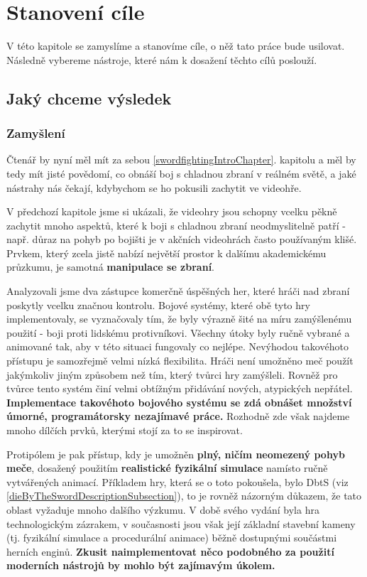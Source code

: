 \chapter{Stanovení cíle}

V této kapitole se zamyslíme a stanovíme cíle, o něž tato práce bude usilovat. Následně vybereme nástroje, které nám k dosažení těchto cílů poslouží.  


\section{Jaký chceme výsledek}

\subsection{Zamyšlení}
Čtenář by nyní měl mít za sebou \ref{swordfightingIntroChapter}. kapitolu a měl by tedy mít jisté povědomí, co obnáší boj s chladnou zbraní v reálném světě, a jaké nástrahy nás čekají, kdybychom se ho pokusili zachytit ve videohře. 

V předchozí kapitole jsme si ukázali, že videohry jsou schopny vcelku pěkně zachytit mnoho aspektů, které k boji s chladnou zbraní neodmyslitelně patří - např. důraz na pohyb po bojišti je v akčních videohrách často používaným klišé. Prvkem, který zcela jistě nabízí největší prostor k dalšímu akademickému průzkumu, je samotná \textbf{manipulace se zbraní}.

Analyzovali jsme dva zástupce komerčně úspěšných her, které hráči nad zbraní poskytly vcelku značnou kontrolu. Bojové systémy, které obě tyto hry implementovaly, se vyznačovaly tím, že byly výrazně šité na míru zamýšlenému použití - boji proti lidskému protivníkovi. Všechny útoky byly ručně vybrané a animované tak, aby v této situaci fungovaly co nejlépe. Nevýhodou takovéhoto přístupu je samozřejmě velmi nízká flexibilita. Hráči není umožněno meč použít jakýmkoliv jiným způsobem než tím, který tvůrci hry zamýšleli. Rovněž pro tvůrce tento systém činí velmi obtížným přidávání nových, atypických nepřátel. \textbf{Implementace takovéhoto bojového systému se zdá obnášet množství úmorné, programátorsky nezajímavé práce.} Rozhodně zde však najdeme mnoho dílčích prvků, kterými stojí za to se inspirovat.

Protipólem je pak přístup, kdy je umožněn \textbf{plný, ničím neomezený pohyb meče}, dosažený použitím \textbf{realistické fyzikální simulace} namísto ručně vytvářených animací. Příkladem hry, která se o toto pokoušela, bylo \acl{DbtS} (viz \ref{dieByTheSwordDescriptionSubsection}), to je rovněž názorným důkazem, že tato oblast vyžaduje mnoho dalšího výzkumu. V době svého vydání byla hra technologickým zázrakem, v současnosti jsou však její základní stavební kameny (tj. fyzikální simulace a procedurální animace) běžně dostupnými součástmi herních enginů. \textbf{Zkusit naimplementovat něco podobného za použití moderních nástrojů by mohlo být zajímavým úkolem.}

